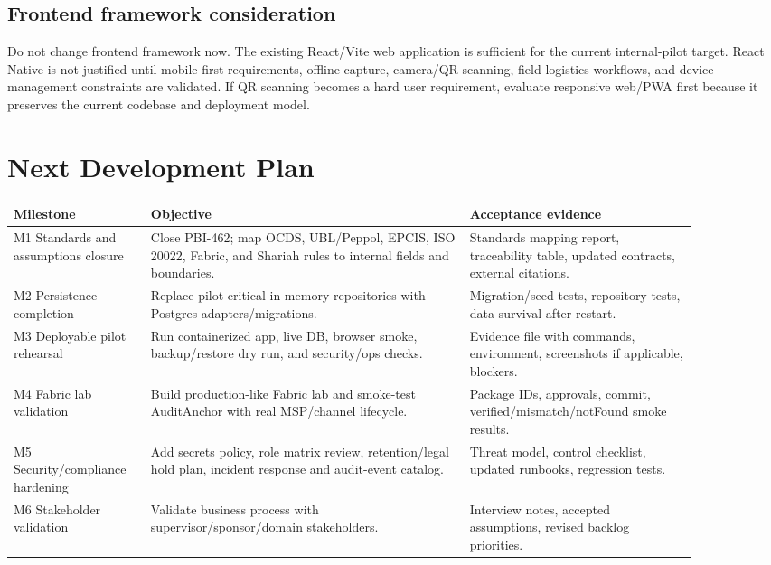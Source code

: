 \documentclass[11pt,a4paper]{article}
\begin{document}
\subsection{Frontend framework consideration}

Do not change frontend framework now. The existing React/Vite web application is sufficient for the current internal-pilot target. React Native is not justified until mobile-first requirements, offline capture, camera/QR scanning, field logistics workflows, and device-management constraints are validated. If QR scanning becomes a hard user requirement, evaluate responsive web/PWA first because it preserves the current codebase and deployment model.

\section{Next Development Plan}

\begin{longtable}{P{0.16\linewidth}P{0.42\linewidth}P{0.30\linewidth}}
\toprule
Milestone & Objective & Acceptance evidence \\
\midrule
M1 Standards and assumptions closure & Close PBI-462; map OCDS, UBL/Peppol, EPCIS, ISO 20022, Fabric, and Shariah rules to internal fields and boundaries. & Standards mapping report, traceability table, updated contracts, external citations. \\
M2 Persistence completion & Replace pilot-critical in-memory repositories with Postgres adapters/migrations. & Migration/seed tests, repository tests, data survival after restart. \\
M3 Deployable pilot rehearsal & Run containerized app, live DB, browser smoke, backup/restore dry run, and security/ops checks. & Evidence file with commands, environment, screenshots if applicable, blockers. \\
M4 Fabric lab validation & Build production-like Fabric lab and smoke-test AuditAnchor with real MSP/channel lifecycle. & Package IDs, approvals, commit, verified/mismatch/notFound smoke results. \\
M5 Security/compliance hardening & Add secrets policy, role matrix review, retention/legal hold plan, incident response and audit-event catalog. & Threat model, control checklist, updated runbooks, regression tests. \\
M6 Stakeholder validation & Validate business process with supervisor/sponsor/domain stakeholders. & Interview notes, accepted assumptions, revised backlog priorities. \\
\bottomrule
\end{longtable}
\end{document}
